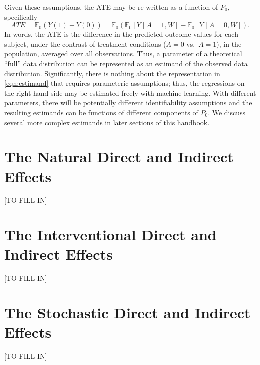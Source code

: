 \documentclass[
  12pt, krantz2,
]{book}
\theoremstyle{definition}
\theoremstyle{definition}
\theoremstyle{definition}
\newcommand{\1}{\mathbbm{1}}
\begin{document}
Given these assumptions, the ATE may be re-written as a function of \(P_0\),
specifically
\begin{equation}\label{eqn:estimand}
  ATE = \mathbb{E}_0(Y(1) - Y(0)) = \mathbb{E}_0
    \left(\mathbb{E}_0[Y \mid A = 1, W] - \mathbb{E}_0[Y \mid A = 0, W]\right).
\end{equation}
In words, the ATE is the difference in the predicted outcome values for each subject, under the
contrast of treatment conditions (\(A = 0\) vs.~\(A = 1\)), in the population,
averaged over all observations. Thus, a parameter of a theoretical ``full'' data
distribution can be represented as an estimand of the observed data
distribution. Significantly, there is nothing about the representation in
\ref{eqn:estimand} that requires parameteric assumptions; thus, the regressions
on the right hand side may be estimated freely with machine learning. With
different parameters, there will be potentially different identifiability
assumptions and the resulting estimands can be functions of different components
of \(P_0\). We discuss several more complex estimands in later sections of this
handbook.

\hypertarget{natural}{%
\chapter{The Natural Direct and Indirect Effects}\label{natural}}

{[}TO FILL IN{]}

\hypertarget{interventional}{%
\chapter{The Interventional Direct and Indirect Effects}\label{interventional}}

{[}TO FILL IN{]}

\hypertarget{stochastic}{%
\chapter{The Stochastic Direct and Indirect Effects}\label{stochastic}}

{[}TO FILL IN{]}

  

\backmatter
\printindex
\end{document}
